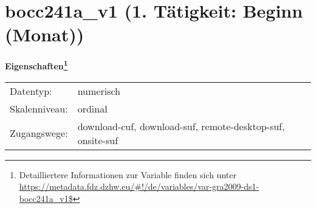 
    \setcounter{footnote}{0}

    \vspace*{-1.8cm}
	\section{bocc241a\_v1 (1. Tätigkeit: Beginn (Monat))}
	\label{section:bocc241a_v1}



    \vspace*{0.5cm}
    \noindent\textbf{Eigenschaften\footnote{Detailliertere Informationen zur Variable finden sich unter
		\url{https://metadata.fdz.dzhw.eu/\#!/de/variables/var-gra2009-ds1-bocc241a_v1$}}}\\
	\begin{tabularx}{\hsize}{@{}lX}
	Datentyp: & numerisch \\
	Skalenniveau: & ordinal \\
	Zugangswege: &
	  download-cuf, 
	  download-suf, 
	  remote-desktop-suf, 
	  onsite-suf
 \\
    \end{tabularx}



